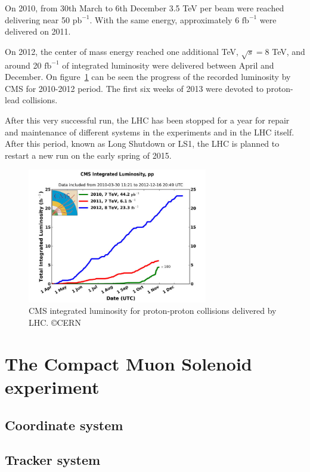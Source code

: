 On 2010, from 30th March to 6th December 3.5 TeV per beam were reached delivering near 50 $\text{pb}^{-1}$. With the same energy, approximately 6 $\text{fb}^{-1}$ were delivered on 2011. 

On 2012, the center of mass energy reached one additional TeV, $\sqrt{s}=8$ TeV, and around 20 $\text{fb}^{-1}$ of integrated luminosity were delivered between April and December. On figure~\ref{fig:CMSlumi} can be seen the progress of the recorded luminosity by CMS for 2010-2012 period. The first six weeks of 2013 were devoted to proton-lead collisions.

After this very successful run, the LHC has been stopped for a year for repair and maintenance of different systems in the experiments and in the LHC itself. After this period, known as Long Shutdown  or LS1, the LHC is planned to restart a new run on the early spring of 2015.

\begin{figure}[!Hhtbp]
  \begin{center}
    \includegraphics[width=0.7\textwidth]{figs/cms-int-10to12.jpg}
    \caption{CMS integrated luminosity for proton-proton collisions delivered by LHC. \copyright CERN}
    \label{fig:CMSlumi}
  \end{center}
\end{figure}

\section{The Compact Muon Solenoid experiment}
\label{sec:CMS}

\subsection{Coordinate system}
\label{sec:Csys}

\subsection{Tracker system}
\label{sec:tracker}

